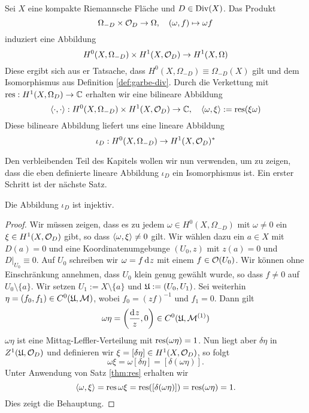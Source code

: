 \begin{defin}
  Sei $X$ eine kompakte Riemannsche Fläche und $D \in \operatorname{Div}(X)$. Das
  Produkt
  \[
  \Omega_{-D} \times \mathcal{O}_D \rightarrow \Omega, \quad (\omega, f) \mapsto
  \omega f
  \]
  induziert eine Abbildung
  \[
  H^0(X, \Omega_{-D}) \times H^1(X, \mathcal{O}_D) \rightarrow H^1(X, \Omega)
  \]
  Diese ergibt sich aus er Tatsache, dass $H^0(X, \Omega_{-D}) \equiv
  \Omega_{-D}(X)$ gilt und dem Isomorphismus aus Definition
  \ref{def:garbe-div}. Durch die Verkettung mit $\operatorname{res}: H^1(X,
  \Omega_D) \rightarrow \mathbb{C}$ erhalten wir eine bilineare Abbildung
  \[
  \langle \cdot, \cdot \rangle: H^0(X, \Omega_{-D}) \times H^1(X, \mathcal{O}_D) \rightarrow \mathbb{C},
  \quad \langle \omega, \xi \rangle := \operatorname{res}(\xi \omega)
  \]
  Diese bilineare Abbildung liefert uns eine lineare Abbildung
  \[
  \iota_D : H^0(X, \Omega_{-D}) \rightarrow H^1(X, \mathcal{O}_D)^\ast
  \]
\end{defin}

Den verbleibenden Teil des Kapitels wollen wir nun verwenden, um zu zeigen, dass die
eben definierte lineare Abbildung $\iota_D$ ein Isomorphismus ist. Ein
erster Schritt ist der nächste Satz.

\begin{thm}
  \label{thm:iota-inj}
  Die Abbildung $\iota_D$ ist injektiv.
\end{thm}

\begin{proof}
  Wir müssen zeigen, dass es zu jedem $\omega \in H^0(X, \Omega_{-D})$
  mit $\omega \neq 0$ ein $\xi \in H^1(X, \mathcal{O}_D)$ gibt, so dass
  $\langle \omega, \xi \rangle \neq 0$ gilt. Wir wählen dazu ein $a \in X$ mit
  $D(a) = 0$ und eine Koordinatenumgebunge $(U_0, z)$ mit $z(a) = 0$
  und $D|_{U_0} \equiv 0$. Auf $U_0$ schreiben wir $\omega = f \d[z]$
  mit einem $f \in \mathcal{O}(U_0)$. Wir können ohne Einschränkung annehmen,
  dass $U_0$ klein genug gewählt wurde, so dass $f \neq 0$ auf $U_0
  \setminus \{a\}$. Wir setzen $U_1 := X \setminus \{a\}$ und $\mathfrak{U} :=
  (U_0, U_1)$. Sei weiterhin $\eta = (f_0, f_1) \in C^0(\mathfrak{U}, \mathcal{M})$,
  wobei $f_0 = (z f)^{-1}$ und $f_1 = 0$. Dann gilt
  \[
  \omega \eta = \left ( \frac{\d[z]}{z}, 0 \right ) \in C^0(\fu,
  \mer^{(1)})
  \]
  $\omega \eta$ ist eine Mittag-Leffler-Verteilung mit
  $\operatorname{res}(\omega\eta) = 1$. Nun liegt aber $\delta \eta$ in $Z^1(\mathfrak{U},
  \mathcal{O}_D)$ und definieren wir $\xi = [\delta \eta] \in H^1(X,
  \mathcal{O}_D)$, so folgt
  \[
  \omega \xi = \omega [\delta \eta] = [ \delta( \omega \eta)].
  \]
  Unter Anwendung von Satz \ref{thm:res} erhalten wir
  \[
  \langle \omega, \xi \rangle = \operatorname{res}{\omega \xi} = \operatorname{res}([\delta(\omega \eta)]) =
  \operatorname{res}(\omega \eta) = 1.
  \]
  Dies zeigt die Behauptung.
\end{proof}

